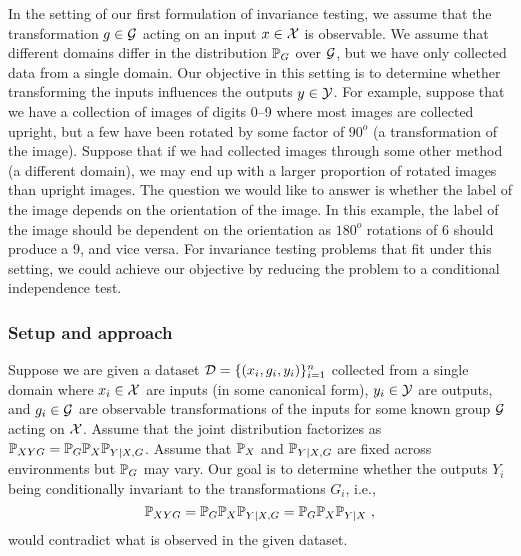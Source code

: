 In the setting of our first formulation of invariance testing, we assume that the transformation $g\in\calG$ acting on an input $x\in\calX$ is observable. We assume that different domains differ in the distribution $\P_G$ over $\calG$, but we have only collected data from a single domain. Our objective in this setting is to determine whether transforming the inputs influences the outputs $y\in\calY$. For example, suppose that we have a collection of images of digits 0--9 where most images are collected upright, but a few have been rotated by some factor of $90^o$ (a transformation of the image). Suppose that if we had collected images through some other method (a different domain), we may end up with a larger proportion of rotated images than upright images. The question we would like to answer is whether the label of the image depends on the orientation of the image. In this example, the label of the image should be dependent on the orientation as $180^o$ rotations of 6 should produce a 9, and vice versa. For invariance testing problems that fit under this setting, we could achieve our objective by reducing the problem to a conditional independence test.

\subsubsection{Setup and approach}

Suppose we are given a dataset $\calD=\{(x_i,g_i,y_i)\}_{i=1}^n$ collected from a single domain where $x_i\in\calX$ are inputs (in some canonical form), $y_i\in\calY$ are outputs, and $g_i\in\calG$ are observable transformations of the inputs for some known group $\calG$ acting on $\calX$. Assume that the joint distribution factorizes as $\P_{XYG}=\P_G\P_X\P_{Y|X,G}$. Assume that $\bbP_X$ and $\bbP_{Y|X,G}$ are fixed across environments but $\bbP_G$ may vary. Our goal is to determine whether the outputs $Y_i$ being conditionally invariant to the transformations $G_i$, i.e.,
\[
\P_{XYG}=\P_G\P_X\P_{Y|X,G} = \P_G\P_X\P_{Y|X}\;,
\]
would contradict what is observed in the given dataset.
\\

